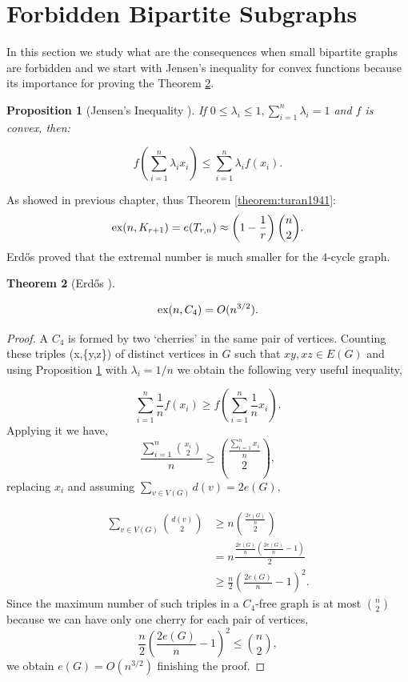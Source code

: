 \documentclass[12pt,twoside,a4paper]{book}
\numberwithin{equation}{section}
\newtheorem{theorem}             {Theorem}[section]
\newtheorem{proposition}[theorem] {Proposition}
\theoremstyle{remark}
\def\ex{\mathop{\text{\rm ex}}\nolimits}
\begin{document}
\section{Forbidden Bipartite Subgraphs}
In this section we study what are the consequences when small bipartite graphs are forbidden and we start with Jensen's inequality for convex functions because its importance for proving the Theorem \ref{theorem: Erdos,1938}.
\begin{proposition}[{Jensen's Inequality \cite{Je06}}]\label{prep:jensen}
 If $0\leq \lambda_i \leq 1, \sum_{i=1}^n \lambda_i = 1$ and $f$ is convex, then:

$$
f \left( \sum_{i=1}^n \lambda_i x_i\right) \leq \sum_{i=1}^n \lambda_i f (x_i).
$$

\end{proposition}

As showed in previous chapter, thus Theorem \ref{theorem:turan1941}:
$$ \ex (n,K_{r+1}) = e(T_{r,n}) \approx \left( 1-\frac{1}{r}\right) \binom{n}{2} .$$
Erd\H{o}s proved that the extremal number is much smaller for the $4$-cycle graph.
 
\begin{theorem}[{Erd\H{o}s \cite{Er38}}] \label{theorem: Erdos,1938}

$$\ex(n,C_4) = O(n^{3/2}).$$
\end{theorem}

\begin{proof}
A $C_4$ is formed by two `cherries' in the same pair of vertices. Counting these triples (x,\{y,z\}) of distinct vertices in $G$ such that $xy, xz \in E(G)$ and using Proposition \ref{prep:jensen} with $\lambda_i = 1/n$ we obtain the following very useful inequality,

$$ \sum_{i=1}^n \frac{1}{n} f\left(x_i\right) \geq f\left(\sum_{i=1}^n \frac{1}{n} x_i\right).$$
Applying it we have,
$$ \frac{\sum_{i=1}^n \binom{x_i}{2}}{n} \geq \binom{\frac{\sum_{i=1}^n x_i}{n}}{2} ,$$
replacing $x_i$ and assuming $\sum_{v \in V(G)} d(v) = 2e(G),$

\begin{align*}
\sum_{v \in V(G)} \binom{d(v)}{2} &\geq n \binom{\frac{2e(G)}{n}}{2}\\
&= n\frac{\frac{2e(G)}{n}\left( \frac{2e(G)}{n}-1\right)}{2} \\
&\geq \frac{n}{2} \left( \frac{2e(G)}{n} - 1 \right)^2.
\end{align*}
Since the maximum number of such triples in a $C_4$-free graph is at most $\binom{n}{2}$ because we can have only one cherry for each pair of vertices,
$$ \frac{n}{2}\left(\frac{2e(G)}{n} - 1\right)^2 \leq \binom{n}{2},$$
we obtain $e(G) = O(n^{3/2})$ finishing the proof.
\end{proof}
\end{document}
